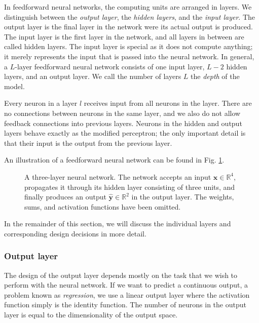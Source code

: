 In feedforward neural networks, the computing units are arranged in layers. We distinguish between the \emph{output layer}, the \emph{hidden layers}, and the \emph{input layer}. The output layer is the final layer in the network were its actual output is produced. The input layer is the first layer in the network, and all layers in between are called hidden layers. The input layer is special as it does not compute anything; it merely represents the input that is passed into the neural network. In general, a $L$-layer feedforward neural network consists of one input layer, $L-2$ hidden layers, and an output layer. We call the number of layers $L$ the \emph{depth} of the model.

Every neuron in a layer $l$ receives input from all neurons in the  layer. There are no connections between neurons in the same layer, and we also do not allow feedback connections into previous layers. Neurons in the hidden and output layers behave exactly as the modified perceptron; the only important detail is that their input is the output from the previous layer.

An illustration of a feedforward neural network can be found in Fig. \ref{fig:network}.
\begin{figure}
	\begin{center}
		
	\end{center}
	\caption{A three-layer neural network. The network accepts an input $\bm{x} \in \mathbb{R}^4$, propagates it through its hidden layer consisting of three units, and finally produces an output $\hat{\bm{y}} \in \mathbb{R}^2$ in the output layer. The weights, sums, and activation functions have been omitted.}
	\label{fig:network}
\end{figure}

In the remainder of this section, we will discuss the individual layers and corresponding design decisions in more detail.

\subsubsection{Output layer}
The design of the output layer depends mostly on the task that we wish to perform with the neural network. If we want to predict a continuous output, a problem known as \emph{regression}, we use a linear output layer where the activation function simply is the identity function. The number of neurons in the output layer is equal to the dimensionality of the output space.

